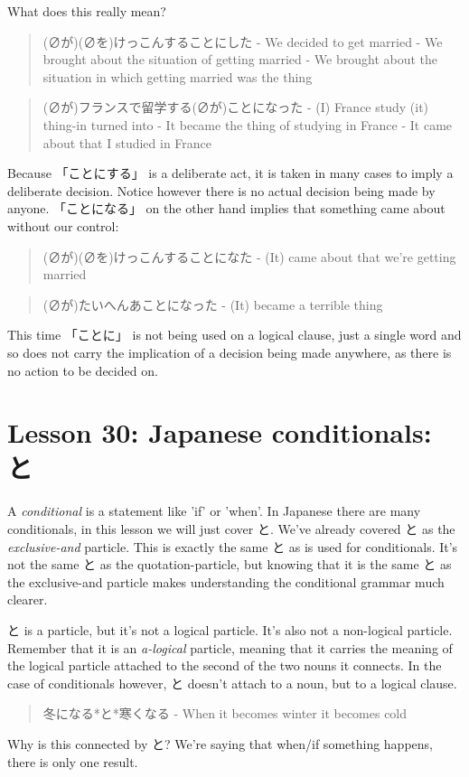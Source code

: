 \documentclass[11pt]{article}
\begin{document}
What does this really mean?
\begin{quote}
(∅が)(∅を)けっこんすることにした - We decided to get married - We brought about the situation of getting married - We brought about the situation in which getting married was the thing
\end{quote}

\begin{quote}
(∅が)フランスで留学する(∅が)ことになった - (I) France study (it) thing-in turned into - It became the thing of studying in France - It came about that I studied in France
\end{quote}
Because 「ことにする」 is a deliberate act, it is taken in many cases to imply a deliberate decision. Notice however there is no actual decision being made by anyone. 「ことになる」 on the other hand implies that something came about without our control:
\begin{quote}
(∅が)(∅を)けっこんすることになた - (It) came about that we're getting married
\end{quote}

\begin{quote}
(∅が)たいへんあことになった - (It) became a terrible thing
\end{quote}
This time 「ことに」 is not being used on a logical clause, just a single word and so does not carry the implication of a decision being made anywhere, as there is no action to be decided on.

\section{Lesson 30: Japanese conditionals: と}
\label{sec:org2812862}
A \emph{conditional} is a statement like 'if' or 'when'. In Japanese there are many conditionals, in this lesson we will just cover と. We've already covered と as the \emph{exclusive-and} particle. This is exactly the same と as is used for conditionals. It's not the same と as the quotation-particle, but knowing that it is the same と as the exclusive-and particle makes understanding the conditional grammar much clearer.

と is a particle, but it's not a logical particle. It's also not a non-logical particle. Remember that it is an \emph{a-logical} particle, meaning that it carries the meaning of the logical particle attached to the second of the two nouns it connects. In the case of conditionals however, と doesn't attach to a noun, but to a logical clause.
\begin{quote}
冬になる*と*寒くなる - When it becomes winter it becomes cold
\end{quote}
Why is this connected by と? We're saying that when/if something happens, there is only one result.
\end{document}
